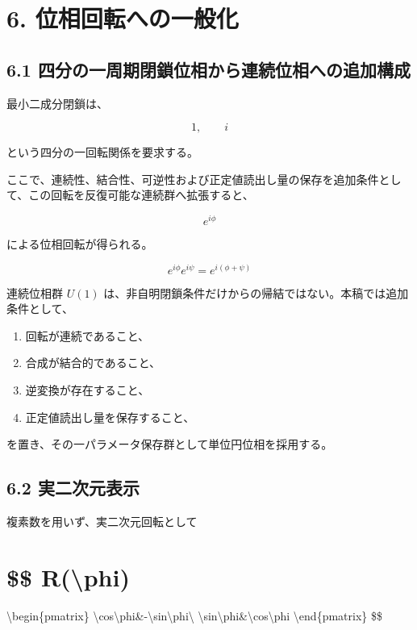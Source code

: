 \documentclass[
  a4paper,
  10pt]{article}
\providecommand{\tightlist}{%
  \setlength{\itemsep}{0pt}\setlength{\parskip}{0pt}}
\begin{document}
\section{6.
位相回転への一般化}\label{6-ux4f4dux76f8ux56deux8ee2ux3078ux306eux4e00ux822cux5316}

\subsection{6.1
四分の一周期閉鎖位相から連続位相への追加構成}\label{61-ux56dbux5206ux306eux4e00ux5468ux671fux9589ux9396ux4f4dux76f8ux304bux3089ux9023ux7d9aux4f4dux76f8ux3078ux306eux8ffdux52a0ux69cbux6210}

最小二成分閉鎖は、

\[
1,
\qquad
i
\]

という四分の一回転関係を要求する。

ここで、連続性、結合性、可逆性および正定値読出し量の保存を追加条件として、この回転を反復可能な連続群へ拡張すると、

\[
e^{i\phi}
\]

による位相回転が得られる。

\[
e^{i\phi}e^{i\psi}=e^{i(\phi+\psi)}
\]

連続位相群 \(U(1)\)
は、非自明閉鎖条件だけからの帰結ではない。本稿では追加条件として、

\begin{enumerate}
\def\labelenumi{\arabic{enumi}.}
\tightlist
\item
  回転が連続であること、
\item
  合成が結合的であること、
\item
  逆変換が存在すること、
\item
  正定値読出し量を保存すること、
\end{enumerate}

を置き、その一パラメータ保存群として単位円位相を採用する。

\subsection{6.2
実二次元表示}\label{62-ux5b9fux4e8cux6b21ux5143ux8868ux793a}

複素数を用いず、実二次元回転として

\section{\$\$ R(\textbackslash phi)}\label{-rphi}

\textbackslash begin\{pmatrix\}
\textbackslash cos\textbackslash phi\&-\textbackslash sin\textbackslash phi\textbackslash{}
\textbackslash sin\textbackslash phi\&\textbackslash cos\textbackslash phi
\textbackslash end\{pmatrix\} \$\$
\end{document}
